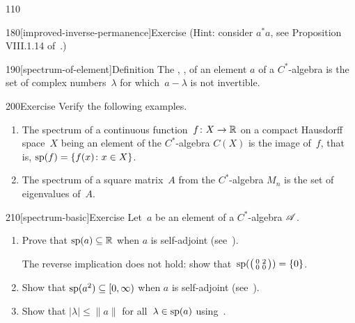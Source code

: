 \begin{parsec}{110}
\begin{point}{180}[improved-inverse-permanence]{Exercise}
(Hint: consider $a^*a$, see Proposition VIII.1.14 of~\cite{conway2013}.)
\end{point}
\begin{point}{190}[spectrum-of-element]{Definition}%
The ,
,%
of an element $a$
of a $C^*$-algebra
is the set 
of complex numbers~$\lambda$
for which~$a-\lambda$ is not invertible.
\end{point}
\begin{point}{200}{Exercise}%
Verify the following examples.
\begin{enumerate}
\item
The spectrum of a continuous function~$f\colon X\to \mathbb{R}$
on a compact Hausdorff space~$X$
being an element of the $C^*$-algebra $C(X)$
is the image of~$f$, that is,
$\mathrm{sp}(f) = \{f(x)\colon x\in X\}$.
\item
The spectrum of a square matrix~$A$
from the $C^*$-algebra $M_n$
is the set of eigenvalues of~$A$.
\end{enumerate}%
\spacingfix%
\end{point}%
\begin{point}{210}[spectrum-basic]{Exercise}%
Let~$a$ be an element of a $C^*$-algebra $\mathscr{A}$.
\begin{enumerate}
\item
Prove that $\mathrm{sp}(a)\subseteq \mathbb{R}$ when $a$ is self-adjoint
(see~).

The reverse implication does not hold:
show that~$\mathrm{sp}(\bigl(
\begin{smallmatrix}0&2\\0&0\end{smallmatrix}\bigr))=\{0\}$.

\item
Show that $\mathrm{sp}(a^2)\subseteq [0,\infty)$ when $a$ is self-adjoint
(see~).

\item
Show that $|\lambda|\leq \|a\|$ for all~$\lambda\in\mathrm{sp}(a)$
using~.


\end{enumerate}
\end{point}
\end{parsec}
